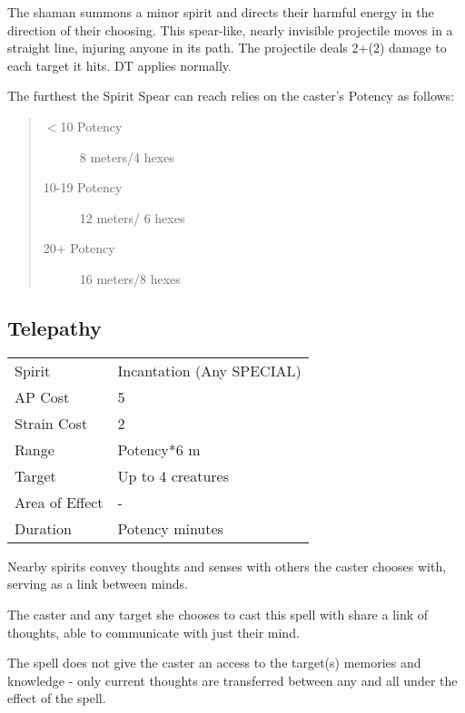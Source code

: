 \documentclass[11pt,a4paper,twocolumn]{book}
\begin{document}
\medskip

The shaman summons a minor spirit and directs their harmful energy in the direction of their choosing. This spear-like, nearly invisible projectile moves in a straight line, injuring anyone in its path. The projectile deals 2+(2) damage to each target it hits. DT applies normally.

The furthest the Spirit Spear can reach relies on the caster's Potency as follows:
\begin{quote}
	\begin{description}
		\item[$<$10 Potency] 	8 meters/4 hexes
		\item[10-19 Potency] 	12 meters/ 6 hexes
		\item[20+ Potency]  	16 meters/8 hexes
	\end{description}	
\end{quote}

\subsection*{Telepathy}
{
	\begin{tabu} to 75mm{| X[l,4] | X[l,7] |}
		\hline
		Spirit         & Incantation (Any SPECIAL) \\
		AP Cost        & 5                         \\
		Strain Cost    & 2                         \\
		Range          & Potency*6 m               \\
		Target         & Up to 4 creatures         \\
		Area of Effect & -                         \\
		Duration       & Potency minutes           \\ \hline
	\end{tabu}
	
}

\medskip

Nearby spirits convey thoughts and senses with others the caster chooses with, serving as a link between minds.

The caster and any target she chooses to cast this spell with share a link of thoughts, able to communicate with just their mind.

The spell does not give the caster an access to the target(s) memories and knowledge - only current thoughts are transferred between any and all under the effect of the spell.
\end{document}
